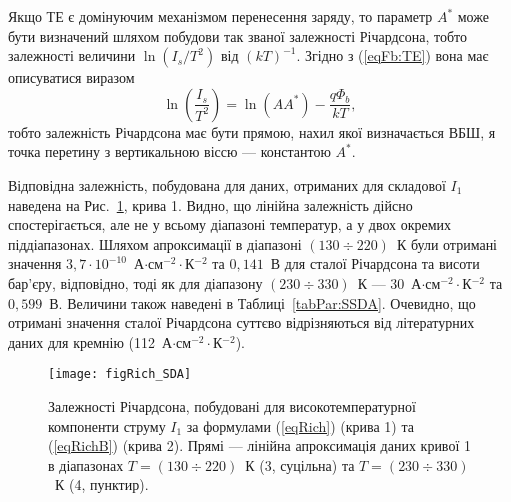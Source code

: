 Якщо ТЕ є домінуючим механізмом перенесення заряду, то параметр $A^*$ може бути
визначений \cite{Rhoderick1988,Schroder2006} шляхом побудови так званої залежності Річардсона,
тобто залежності величини $\ln(I_s/T^2)$ від $(kT)^{-1}$.
Згідно з (\ref{eqFb:TE}) вона має описуватися виразом
\begin{equation}\label{eqRich}
\ln\left(\frac{I_s}{T^2}\right)=\ln(AA^*)-\frac{q\Phi_b}{kT},
\end{equation}
тобто залежність Річардсона має бути прямою, нахил якої визначається ВБШ,
я точка перетину з вертикальною віссю --- константою $A^*$.


Відповідна залежність, побудована для даних, отриманих для складової $I_1$ наведена
на Рис.~\ref{figRich_SDA}, крива 1.
Видно, що лінійна залежність дійсно спостерігається, але не у всьому діапазоні температур, а у двох окремих піддіапазонах.
Шляхом апроксимації в діапазоні $(130\div220)$~К були отримані значення $3,7\cdot10^{-10}$~А$\cdot$см$^{-2}\cdot$К$^{-2}$ та
$0,141$~В для сталої Річардсона та висоти бар'єру, відповідно,
тоді як для діапазону $(230\div330)$~К ---
$30$~А$\cdot$см$^{-2}\cdot$К$^{-2}$ та $0,599$~В.
Величини також наведені в Таблиці~\ref{tabPar:SSDA}.
Очевидно, що отримані значення сталої Річардсона суттєво відрізняються від літературних даних
для кремнію (112~А$\cdot$см$^{-2}\cdot$К$^{-2}$).


\begin{figure}
\center
\texttt{[image: figRich\_SDA]}
\caption{\label{figRich_SDA}
Залежності Річардсона, побудовані для високотемпературної компоненти струму $I_1$
за формулами (\ref{eqRich}) (крива 1) та (\ref{eqRichB}) (крива 2).
Прямі --- лінійна апроксимація даних кривої 1 в діапазонах $T=(130\div220)$~К (3, суцільна)
та $T=(230\div330)$~К (4, пунктир).
}%
\end{figure}



